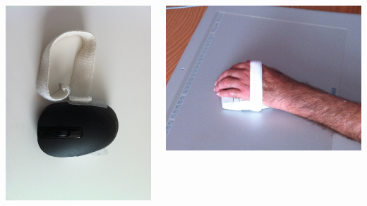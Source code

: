 \documentclass{beamer}
\begin{document}
\begin{frame}

\begin{columns}
	\begin{column}{0.5\textwidth}
		\includegraphics[scale=0.05]{images/souris.JPG}
	\end{column}
	\begin{column}{0.5\textwidth}
		\includegraphics[scale=0.05]{images/main.JPG}
	\end{column}
\end{columns}

\end{frame}
\end{document}

